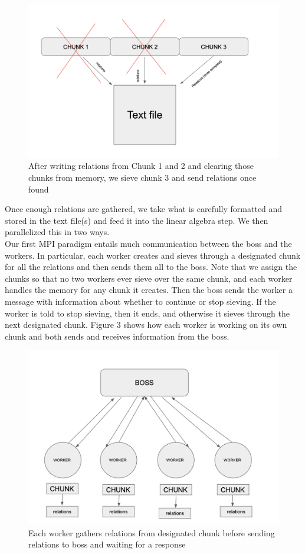 \documentclass[11pt,twocolumn]{article}
\begin{document}
\begin{figure}[!htb]
    \centering
   \includegraphics[scale = 0.2]{SieveSol.png}
    \caption{After writing relations from Chunk 1 and 2 and clearing those chunks from memory, we sieve chunk 3 and send relations once found}
    \label{Seq-Sieve}
\end{figure}

Once enough relations are gathered, we take what is carefully formatted and stored in the text file(s) and feed it into the linear algebra step. We then parallelized this in two ways. \\
\indent Our first MPI paradigm entails much communication between the boss and the workers. In particular, each worker creates and sieves through a designated chunk for all the relations and then sends them all to the boss. Note that we assign the chunks so that no two workers ever sieve over the same chunk, and each worker handles the memory for any chunk it creates. Then the boss sends the worker a message with information about whether to continue or stop sieving. If the worker is told to stop sieving, then it ends, and otherwise it sieves through the next designated chunk. Figure 3 shows how each worker is working on its own chunk and both sends and receives information from the boss.

\begin{figure}[!htb]
    \centering
   \includegraphics[scale = 0.2]{MPI-Para1.png}
    \caption{Each worker gathers relations from designated chunk before sending relations to boss and waiting for a response}
    \label{MPI-V1}
\end{figure}
\end{document}
